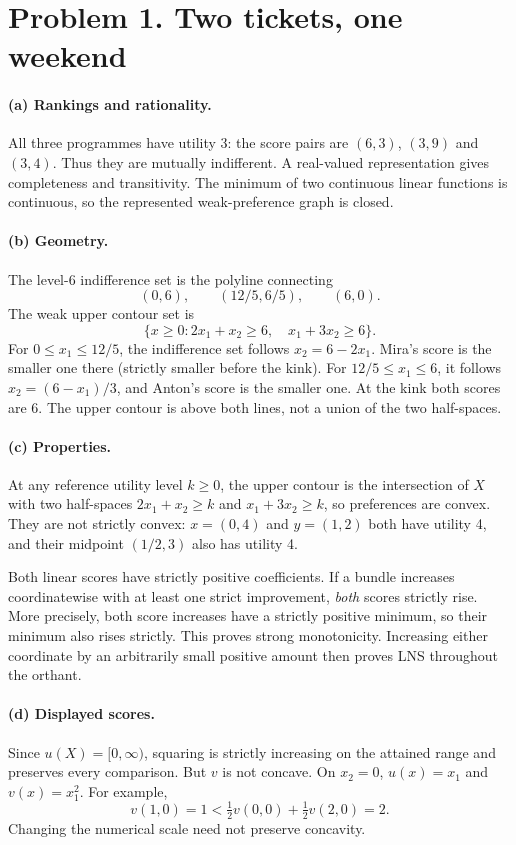 \documentclass[11pt,a4paper]{article}
\begin{document}
\section*{Problem 1. Two tickets, one weekend}
\paragraph{(a) Rankings and rationality.} All three programmes have utility 3: the score pairs are $(6,3)$, $(3,9)$ and $(3,4)$. Thus they are mutually indifferent. A real-valued representation gives completeness and transitivity. The minimum of two continuous linear functions is continuous, so the represented weak-preference graph is closed.
\paragraph{(b) Geometry.} The level-6 indifference set is the polyline connecting
\[
 (0,6),\qquad(12/5,6/5),\qquad(6,0).
\]
The weak upper contour set is
\[
 \{x\ge0:2x_1+x_2\ge6,\quad x_1+3x_2\ge6\}.
\]
For $0\le x_1\le12/5$, the indifference set follows $x_2=6-2x_1$. Mira's score is the smaller one there (strictly smaller before the kink). For $12/5\le x_1\le6$, it follows $x_2=(6-x_1)/3$, and Anton's score is the smaller one. At the kink both scores are 6. The upper contour is above both lines, not a union of the two half-spaces.
\paragraph{(c) Properties.} At any reference utility level $k\ge0$, the upper contour is the intersection of $X$ with two half-spaces $2x_1+x_2\ge k$ and $x_1+3x_2\ge k$, so preferences are convex. They are not strictly convex: $x=(0,4)$ and $y=(1,2)$ both have utility 4, and their midpoint $(1/2,3)$ also has utility 4.

Both linear scores have strictly positive coefficients. If a bundle increases coordinatewise with at least one strict improvement, \emph{both} scores strictly rise. More precisely, both score increases have a strictly positive minimum, so their minimum also rises strictly. This proves strong monotonicity. Increasing either coordinate by an arbitrarily small positive amount then proves LNS throughout the orthant.
\paragraph{(d) Displayed scores.} Since $u(X)=[0,\infty)$, squaring is strictly increasing on the attained range and preserves every comparison. But $v$ is not concave. On $x_2=0$, $u(x)=x_1$ and $v(x)=x_1^2$. For example,
\[
 v(1,0)=1<\tfrac12v(0,0)+\tfrac12v(2,0)=2.
\]
Changing the numerical scale need not preserve concavity.
\end{document}
